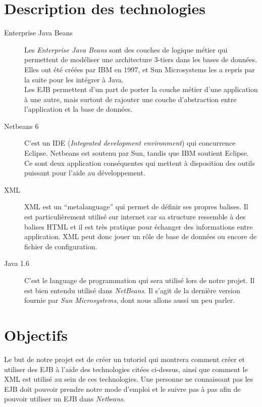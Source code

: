 \documentclass[a4paper, 11pt]{article}
\begin{document}
{\section{Description des technologies}

	\begin{description}

		\item[Enterprise Java Beans] Les \emph{Enterprise Java Beans} sont des couches de logique métier qui permettent de modéliser une architecture 3-tiers dans les bases de données. Elles ont été créées par IBM en 1997, et Sun Microsystems les a repris par la suite pour les intégrer à Java. \\

Les EJB permettent d'un part de porter la couche métier d'une application à une autre, mais surtout de rajouter une couche d'abstraction entre l'application et la base de données. 

		\item[Netbeans 6] C'est un IDE (\emph{Integrated development environment}) qui concurrence Eclipse. Netbeans est soutenu par Sun, tandis que IBM soutient Eclipse. Ce sont deux application conséquentes qui mettent à disposition des outils puissant pour l'aide au développement. \\

		\item[XML] XML est un “metalanguage” qui permet de définir ses propres balises. Il est particulièrement utilisé sur internet car sa structure ressemble à des balises HTML et il est très pratique pour échanger des informations entre application. XML peut donc jouer un rôle de base de données ou encore de fichier de configuration. \\

		\item[Java 1.6] C'est le language de programmation qui sera utilisé lors de notre projet. Il est bien entendu utilisé dans \emph{NetBeans}. Il s'agit de la dernière version fournie par \emph{Sun Microsystems}, dont nous allons aussi un peu parler.\\

   	\end{description}

\section{Objectifs}

	\label{sec:objectifs}

	Le but de notre projet est de créer un tutoriel qui montrera comment créer et utiliser des EJB à l'aide des technologies citées ci-dessus, ainsi que comment le XML est utilisé au sein de ces technologies. Une personne ne connaissant pas les EJB doit pouvoir prendre notre mode d'emploi et le suivre pas à pas afin de pouvoir utiliser un EJB dans \emph{Netbeans}.
	
}
\end{document}
